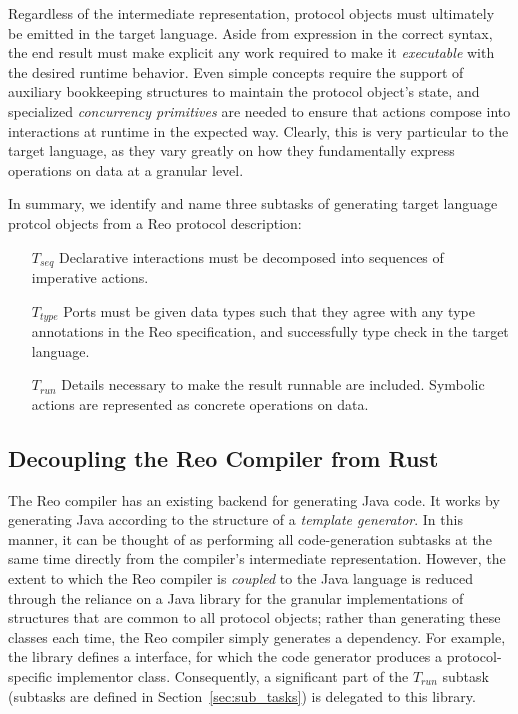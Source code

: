 Regardless of the intermediate representation, protocol objects must ultimately be emitted in the target language. Aside from expression in the correct syntax, the end result must make explicit any work required to make it \textit{executable} with the desired runtime behavior. Even simple concepts require the support of auxiliary bookkeeping structures to maintain the protocol object's state, and specialized \textit{concurrency primitives} are needed to ensure that actions compose into interactions at runtime in the expected way. Clearly, this is very particular to the target language, as they vary greatly on how they fundamentally express operations on data at a granular level.

In summary, we identify and name three subtasks of generating target language protcol objects from a Reo protocol description:
\begin{itemize}
	\item [$T_{seq}$] Declarative interactions must be decomposed into sequences of imperative actions.
	\item [$T_{type}$] Ports must be given data types such that they agree with any type annotations in the Reo specification, and successfully type check in the target language.
	\item [$T_{run}$] Details necessary to make the result runnable are included. Symbolic actions are represented as concrete operations on data.
\end{itemize}


\subsection{Decoupling the Reo Compiler from Rust}
\label{sec:decoupling_reo_rust}
The Reo compiler has an existing backend for generating Java code. It works by generating Java according to the structure of a \textit{template generator}. In this manner, it can be thought of as performing all code-generation subtasks at the same time directly from the compiler's intermediate representation. However, the extent to which the Reo compiler is \textit{coupled} to the Java language is reduced through the reliance on a Java library for the granular implementations of structures that are common to all protocol objects; rather than generating these classes each time, the Reo compiler simply generates a dependency. For example, the library defines a  interface, for which the code generator produces a protocol-specific implementor class. Consequently, a significant part of the $T_{run}$ subtask (subtasks are defined in Section~\ref{sec:sub_tasks}) is delegated to this library.

